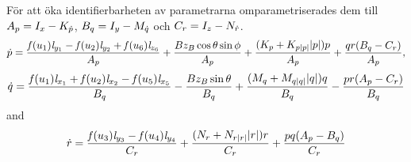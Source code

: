 \documentclass[11pt,aspectratio=169]{beamer}
\begin{document}
\begin{frame}[shrink]
För att öka identifierbarheten av parametrarna omparametriserades dem till $A_p = I_{x} - K_{\dot{p}}$, $B_q = I_{y} - M_{\dot{q}}$ och $C_r = I_{z} - N_{\dot{r}}$.
\begin{multline*}
\dot{p} = \frac{\mathit{f}(u_{1}) \mathit{l}_{y_{1}} - \mathit{f}(u_{2}) \mathit{l}_{y_{2}} + \mathit{f}(u_{6}) \mathit{l}_{z_{6}}}{A_p} + \frac{B z_B \cos{\theta} \sin{\phi}}{A_p} + \frac{(K_{p} + K_{p|p|} |p|)p}{A_p} + \frac{q r (B_q - C_r)}{A_p},
\end{multline*}
\begin{multline*} 
\dot{q} = \frac{\mathit{f}(u_{1}) \mathit{l}_{x_{1}} + \mathit{f}(u_{2}) \mathit{l}_{x_{2}} - \mathit{f}(u_{5}) \mathit{l}_{x_{5}}}{B_q} - \frac{B z_B \sin{\theta}}{B_q} + \frac{(M_{q} + M_{q|q|} |q|)q}{B_q} - \frac{p r (A_p - C_r)}{B_q}
\end{multline*}
and
\begin{multline*} 
\dot{r} = \frac{\mathit{f}(u_{3}) \mathit{l}_{y_{3}} - \mathit{f}(u_{4}) \mathit{l}_{y_{4}}}{C_r} + \frac{(N_{r} + N_{r|r|} |r|)r}{C_r} + \frac{p q (A_p  - B_q)}{C_r}
\end{multline*}
\end{frame}


\end{document}
